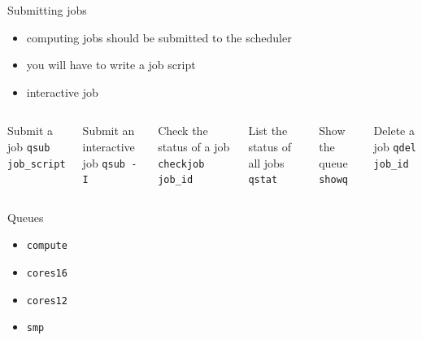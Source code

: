 \documentclass{beamer}
\begin{document}
\begin{frame}[fragile]{Submitting jobs}
	\begin{itemize}
		\item computing jobs should be submitted to the scheduler
		\item you will have to write a job script
		\item interactive job
	\end{itemize}
    \begin{Examples}
	    \begin{columns}
		\begin{block}{Submit a job}
			\texttt{qsub job\_script}
		\end{block}
		\begin{block}{Submit an interactive job}
			\texttt{qsub -I}
		\end{block}
		\begin{block}{Check the status of a job}
			\texttt{checkjob job\_id}
		\end{block}

		\begin{block}{List the status of all jobs}
			\texttt{qstat}
		\end{block}
		\begin{block}{Show the queue}
			\texttt{showq}
		\end{block}		
		\begin{block}{Delete a job}
			\texttt{qdel job\_id}
		\end{block}
	    \end{columns}		
    \end{Examples}
\end{frame}

\begin{frame}{Queues}
	\begin{itemize}
		\item \texttt{compute}
		\item \texttt{cores16}
		\item \texttt{cores12}
		\item \texttt{smp}
	\end{itemize}
\end{frame}
\end{document}
